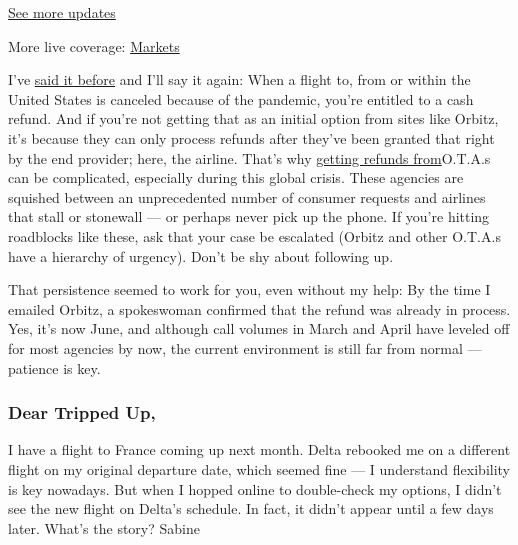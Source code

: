 \href{https://www.nytimes.com/2020/08/01/world/coronavirus-covid-19.html?action=click\&pgtype=Article\&state=default\&region=MAIN_CONTENT_1\&context=storylines_live_updates}{See
more updates}

More live coverage:
\href{https://www.nytimes.com/live/2020/07/31/business/stock-market-today-coronavirus?action=click\&pgtype=Article\&state=default\&region=MAIN_CONTENT_1\&context=storylines_live_updates}{Markets}

I've
\href{https://www.nytimes.com/2020/05/01/travel/trip-refund-airlines.html}{said
it before} and I'll say it again: When a flight to, from or within the
United States is canceled because of the pandemic, you're entitled to a
cash refund. And if you're not getting that as an initial option from
sites like Orbitz, it's because they can only process refunds after
they've been granted that right by the end provider; here, the airline.
That's why
\href{https://www.nytimes.com/2020/04/03/travel/coronavirus-refund-travel-ota.html?smtyp=cur\&smid=tw-nytimestravelhttps://www.nytimes.com/2020/04/03/travel/coronavirus-refund-travel-ota.html}{getting
refunds from}O.T.A.s can be complicated, especially during this global
crisis. These agencies are squished between an unprecedented number of
consumer requests and airlines that stall or stonewall --- or perhaps
never pick up the phone. If you're hitting roadblocks like these, ask
that your case be escalated (Orbitz and other O.T.A.s have a hierarchy
of urgency). Don't be shy about following up.

That persistence seemed to work for you, even without my help: By the
time I emailed Orbitz, a spokeswoman confirmed that the refund was
already in process. Yes, it's now June, and although call volumes in
March and April have leveled off for most agencies by now, the current
environment is still far from normal --- patience is key.

\hypertarget{dear-tripped-up-1}{%
\subsubsection{\texorpdfstring{\textbf{Dear Tripped
Up,}}{Dear Tripped Up,}}\label{dear-tripped-up-1}}

I have a flight to France coming up next month. Delta rebooked me on a
different flight on my original departure date, which seemed fine --- I
understand flexibility is key nowadays. But when I hopped online to
double-check my options, I didn't see the new flight on Delta's
schedule. In fact, it didn't appear until a few days later. What's the
story? Sabine

